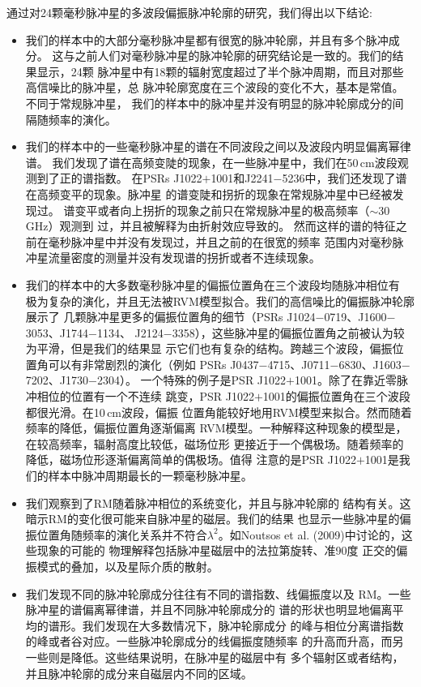 通过对24颗毫秒脉冲星的多波段偏振脉冲轮廓的研究，我们得出以下结论:
\begin{itemize}
\item 我们的样本中的大部分毫秒脉冲星都有很宽的脉冲轮廓，并且有多个脉冲成分。
这与之前人们对毫秒脉冲星的脉冲轮廓的研究结论是一致的。我们的结果显示，24颗
脉冲星中有18颗的辐射宽度超过了半个脉冲周期，而且对那些高信噪比的脉冲星，总
脉冲轮廓宽度在三个波段的变化不大，基本是常值。不同于常规脉冲星\supercite{Cordes78,Thorsett91,Mitra02,Mitra04,Chen14}，
我们的样本中的脉冲星并没有明显的脉冲轮廓成分的间隔随频率的演化\supercite{Kramer99}。
\item 我们的样本中的一些毫秒脉冲星的谱在不同波段之间以及波段内明显偏离幂律谱。
我们发现了谱在高频变陡的现象，在一些脉冲星中，我们在50\,cm波段观测到了正的谱指数。
在PSRs J1022$+$1001和J2241$-$5236中，我们还发现了谱在高频变平的现象。脉冲星
的谱变陡和拐折的现象在常规脉冲星中已经被发现过\supercite{Maron00,Kijak11}。
谱变平或者向上拐折的现象之前只在常规脉冲星的极高频率（$\sim$30\,GHz）观测到
过\supercite{Kramer96}，并且被解释为由折射效应导致的\supercite{Petrova02}。
然而这样的谱的特征之前在毫秒脉冲星中并没有发现过，并且之前的在很宽的频率
范围内对毫秒脉冲星流量密度的测量并没有发现谱的拐折或者不连续现象\supercite{Kramer99,Kuzmin01}。
\item 我们的样本中的大多数毫秒脉冲星的偏振位置角在三个波段均随脉冲相位有
极为复杂的演化，并且无法被RVM模型拟合。我们的高信噪比的偏振脉冲轮廓展示了
几颗脉冲星更多的偏振位置角的细节（PSRs J1024$-$0719、J1600$-$3053、J1744$-$1134、
J2124$-$3358），这些脉冲星的偏振位置角之前被认为较为平滑，但是我们的结果显
示它们也有复杂的结构。跨越三个波段，偏振位置角可以有非常剧烈的演化（例如
PSRs J0437$-$4715、J0711$-$6830、J1603$-$7202、J1730$-$2304）。
一个特殊的例子是PSR J1022$+$1001。除了在靠近零脉冲相位的位置有一个不连续
跳变，PSR J1022$+$1001的偏振位置角在三个波段都很光滑。在10\,cm波段，偏振
位置角能较好地用RVM模型来拟合。然而随着频率的降低，偏振位置角逐渐偏离
RVM模型。一种解释这种现象的模型是，在较高频率，辐射高度比较低，磁场位形
更接近于一个偶极场。随着频率的降低，磁场位形逐渐偏离简单的偶极场。值得
注意的是PSR J1022$+$1001是我们的样本中脉冲周期最长的一颗毫秒脉冲星。
\item 我们观察到了RM随着脉冲相位的系统变化，并且与脉冲轮廓的
结构有关。这暗示RM的变化很可能来自脉冲星的磁层。我们的结果
也显示一些脉冲星的偏振位置角随频率的演化关系并不符合$\lambda^2$。如Noutsos 
et al. (2009)\supercite{Noutsos09}中讨论的，这些现象的可能的
物理解释包括脉冲星磁层中的法拉第旋转\supercite{Kennett98,Wang11}、准90度
正交的偏振模式的叠加\supercite{Ramach04}，以及星际介质的散射\supercite{Kara09}。
\item 我们发现不同的脉冲轮廓成分往往有不同的谱指数、线偏振度以及
RM。一些脉冲星的谱偏离幂律谱，并且不同脉冲轮廓成分的
谱的形状也明显地偏离平均的谱形。我们发现在大多数情况下，脉冲轮廓成分
的峰与相位分离谱指数的峰或者谷对应。一些脉冲轮廓成分的线偏振度随频率
的升高而升高，而另一些则是降低。这些结果说明，在脉冲星的磁层中有
多个辐射区或者结构，并且脉冲轮廓的成分来自磁层内不同的区域\supercite{Dyks10}。
\end{itemize}

